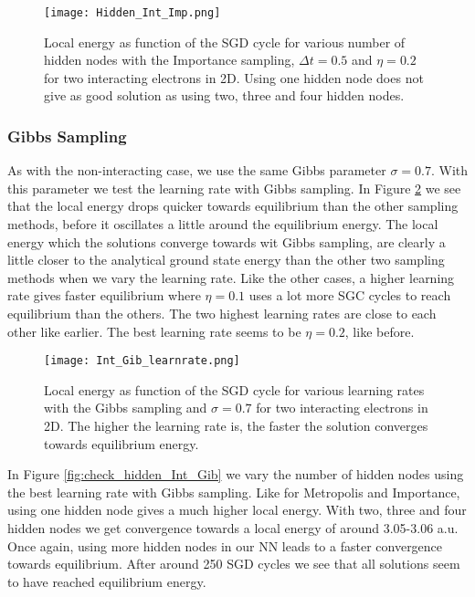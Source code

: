 \documentclass[12pt,a4paper,english]{article}
\begin{document}
\begin{figure}[t!]
	\centering\texttt{[image: Hidden\_Int\_Imp.png]}
	\caption{Local energy as function of the SGD cycle for various number of hidden nodes with the Importance sampling, $\Delta t=0.5$ and $\eta=0.2$ for two interacting electrons in 2D. Using one hidden node does not give as good solution as using two, three and four hidden nodes. \label{fig:check_hidden_Int_Imp}}
\end{figure} 

\newpage
\subsubsection{Gibbs Sampling}
\label{subsubsect:Results_int_Gibbs}
As with the non-interacting case, we use the same Gibbs parameter $\sigma=0.7$. With this parameter we test the learning rate with Gibbs sampling. In Figure \ref{fig:check_learnrate_Int_Gib} we see that the local energy drops quicker towards equilibrium than the other sampling methods, before it oscillates a little around the equilibrium energy. The local energy which the solutions converge towards wit Gibbs sampling, are clearly a little closer to the analytical ground state energy than the other two sampling methods when we vary the learning rate. Like the other cases, a higher learning rate gives faster equilibrium where $\eta=0.1$ uses a lot more SGC cycles to reach equilibrium than the others. The two highest learning rates are close to each other like earlier. The best learning rate seems to be $\eta=0.2$, like before.

\begin{figure}[t!]
	\centering\texttt{[image: Int\_Gib\_learnrate.png]}
	\caption{Local energy as function of the SGD cycle for various learning rates with the Gibbs sampling and $\sigma=0.7$ for two interacting electrons in 2D. The higher the learning rate is, the faster the solution converges towards equilibrium energy. \label{fig:check_learnrate_Int_Gib}}
\end{figure}

\newpage
In Figure \ref{fig:check_hidden_Int_Gib} we vary the number of hidden nodes using the best learning rate with Gibbs sampling. Like for Metropolis and Importance, using one hidden node gives a much higher local energy. With two, three and four hidden nodes we get convergence towards a local energy of around 3.05-3.06 a.u. Once again, using more hidden nodes in our NN leads to a faster convergence towards equilibrium. After around 250 SGD cycles we see that all solutions seem to have reached equilibrium energy.
\end{document}
